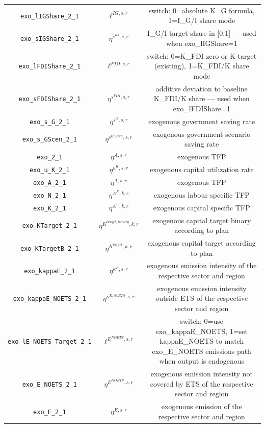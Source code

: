 \begin{center}
\begin{longtable}{ccc}
\texttt{exo\_lIGShare\_2\_1} & ${\ell^{IG,s,r}}$ & switch: 0=absolute K\_G formula, 1=I\_G/I share mode\\
\texttt{exo\_sIGShare\_2\_1} & ${\eta^{s^{IG},s,r}}$ & I\_G/I target share in [0,1] — used when exo\_lIGShare=1\\
\texttt{exo\_lFDIShare\_2\_1} & ${\ell^{FDI,s,r}}$ & switch: 0=K\_FDI zero or K-target (existing), 1=K\_FDI/K share mode\\
\texttt{exo\_sFDIShare\_2\_1} & ${\eta^{s^{FDI},s,r}}$ & additive deviation to baseline K\_FDI/K share — used when exo\_lFDIShare=1\\
\texttt{exo\_s\_G\_2\_1} & ${\eta^{s^G,s,r}}$ & exogenous government saving rate\\
\texttt{exo\_s\_GScen\_2\_1} & ${\eta^{s^{G,Scen},s,r}}$ & exogenous government scenario saving rate\\
\texttt{exo\_2\_1} & ${\eta^{A,s,r}}$ & exogenous TFP\\
\texttt{exo\_u\_K\_2\_1} & ${\eta^{u^K,s,r}}$ & exogenous capital utilization rate\\
\texttt{exo\_A\_2\_1} & ${\eta^{A,s,r}}$ & exogenous TFP\\
\texttt{exo\_N\_2\_1} & ${\eta^{A^{N},k,r}}$ & exogenous labour specific TFP\\
\texttt{exo\_K\_2\_1} & ${\eta^{A^{K},k,r}}$ & exogenous capital specific TFP\\
\texttt{exo\_KTarget\_2\_1} & ${\eta^{K^{target,Binary},k,r}}$ & exogenous capital target binary according to plan\\
\texttt{exo\_KTargetB\_2\_1} & ${\eta^{K^{target},k,r}}$ & exogenous capital target according to plan\\
\texttt{exo\_kappaE\_2\_1} & ${\eta^{\kappa^{E},s,r}}$ & exogenous emission intensity of the respective sector and region\\
\texttt{exo\_kappaE\_NOETS\_2\_1} & ${\eta^{\kappa^{E,No ETS},s,r}}$ & exogenous emission intensity outside ETS of the respective sector and region\\
\texttt{exo\_lE\_NOETS\_Target\_2\_1} & ${\ell^{E^{NOETS},s,r}}$ & switch: 0=use exo\_kappaE\_NOETS, 1=set kappaE\_NOETS to match exo\_E\_NOETS emissions path when output is endogenous\\
\texttt{exo\_E\_NOETS\_2\_1} & ${\eta^{E^{NOETS},s,r}}$ & exogenous emission intensity not covered by ETS of the respective sector and region\\
\texttt{exo\_E\_2\_1} & ${\eta^{E,s,r}}$ & exogenous emission of the respective sector and region\\

\end{longtable}
\end{center}
